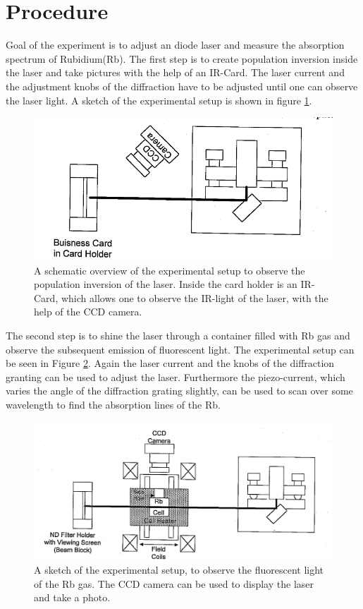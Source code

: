 \section{Procedure}
Goal of the experiment is to adjust an diode laser and measure the absorption spectrum of Rubidium(Rb). 
The first step is to create population inversion inside the laser and take pictures with the help of an IR-Card.
The laser current and the adjustment knobs of the diffraction have to be adjusted until one can observe the laser light.
A sketch of the experimental setup is shown in figure \ref{fig:exp1}.
\begin{figure}
    \centering
    \includegraphics[width = \linewidth]{Bilder/exp1.png}
    \caption{A schematic overview of the experimental setup to observe the population inversion of the laser. Inside the card holder is an IR-Card, which allows one to observe the IR-light of the laser, with the help of the CCD camera.\cite{sample}}
    \label{fig:exp1}
\end{figure}
The second step is to shine the laser through a container filled with Rb gas and observe the subsequent emission of fluorescent light.  The experimental setup can be seen in Figure \ref{fig:exp2}. Again the laser current and the knobs of the diffraction granting can be used to adjust the laser. Furthermore the piezo-current, which varies the angle of the diffraction grating slightly, can be used to scan over some wavelength to find the absorption lines of the Rb.
\begin{figure}
    \centering
    \includegraphics[width = \linewidth]{Bilder/exp2.png}
    \caption{A sketch of the experimental setup, to observe the fluorescent light of the Rb gas. The CCD camera can be used to display the laser and take a photo. }
    \label{fig:exp2}
\end{figure}
